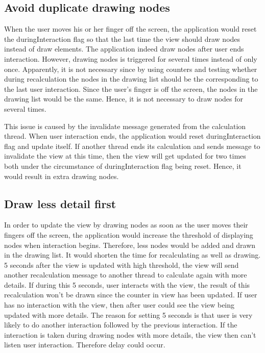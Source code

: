 \documentclass[MSc]{icldt}
\begin{document}
\subsection{Avoid duplicate drawing nodes}

When the user moves his or her finger off the screen, the application would reset the duringInteraction flag so that the last time the view should draw nodes instead of draw elements. The application indeed draw nodes after user ends interaction. However, drawing nodes is triggered for several times instead of only once. Apparently, it is not necessary since by using counters and testing whether during recalculation the nodes in the drawing list should be the corresponding to the last user interaction. Since the user's finger is off the screen, the nodes in the drawing list would be the same. Hence, it is not necessary to draw nodes for several times.

This issue is caused by the invalidate message generated from the calculation thread. When user interaction ends, the application would reset duringInteraction flag and update itself. If another thread ends its calculation and sends message to invalidate the view at this time, then the view will get updated for two times both under the circumstance of duringInteraction flag being reset. Hence, it would result in extra drawing nodes.


\subsection{Draw less detail first}

In order to update the view by drawing nodes as soon as the user moves their fingers off the screen, the application would increase the threshold of displaying nodes when interaction begins. Therefore, less nodes would be added and drawn in the drawing list. It would shorten the time for recalculating as well as drawing. 5 seconds after the view is updated with high threshold, the view will send another recalculation message to another thread to calculate again with more details. If during this 5 seconds, user interacts with the view, the result of this recalculation won't be drawn since the counter in view has been updated. If user has no interaction with the view, then after user could see the view being updated with more details. The reason for setting 5 seconds is that user is very likely to do another interaction followed by the previous interaction. If the interaction is taken during drawing nodes with more details, the view then can't listen user interaction. Therefore delay could occur. 
\end{document}
